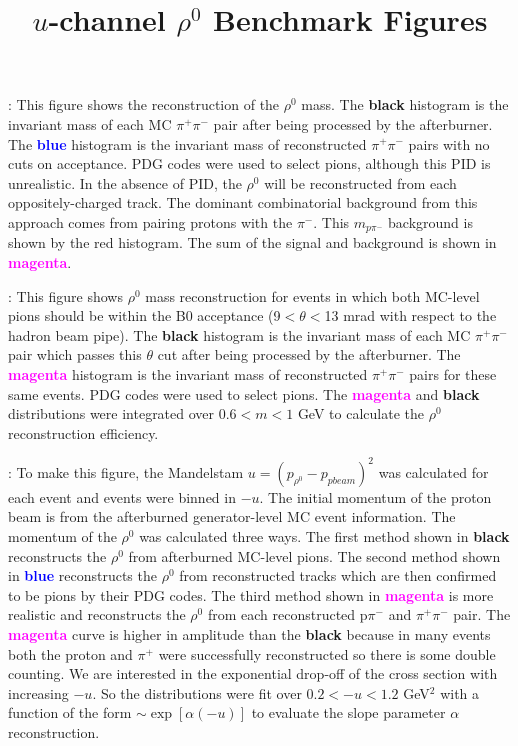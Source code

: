 \documentclass{bench}
\begin{document}
\title{$u$-channel $\rho^0$ Benchmark Figures}


\maketitle

:
This figure shows the reconstruction of the $\rho^0$ mass. The \textbf{black} histogram is the invariant mass of each MC $\pi^+\pi^-$ pair after being processed by the afterburner. The \textbf{\textcolor{blue}{blue}} histogram is the invariant mass of reconstructed $\pi^+\pi^-$ pairs with no cuts on acceptance. PDG codes were used to select pions, although this PID is unrealistic. In the absence of PID, the $\rho^0$ will be reconstructed from each oppositely-charged track. The dominant combinatorial background from this approach comes from pairing protons with the $\pi^-$. This $m_{p\pi^-}$ background is shown by the red histogram. The sum of the signal and background is shown in
\textbf{\textcolor{magenta}{magenta}}.


:
This figure shows $\rho^0$ mass reconstruction for events in which both MC-level pions should be within the B0 acceptance (9$<\theta<$13 mrad with respect to the hadron beam pipe). The \textbf{black} histogram is the invariant mass of each MC $\pi^+\pi^-$ pair which passes this $\theta$ cut after being processed by the afterburner. The \textbf{\textcolor{magenta}{magenta}} histogram is the invariant mass of reconstructed $\pi^+\pi^-$ pairs for these same events. PDG codes were used to select pions. The \textbf{\textcolor{magenta}{magenta}} and \textbf{black} distributions were integrated over $0.6<m<1$ GeV to calculate the $\rho^0$ reconstruction efficiency.


:
To make this figure, the Mandelstam $u = (p_{\rho^0}-p_{p beam})^2$ was calculated for each event and events were binned in $-u$. The initial momentum of the proton beam is from the afterburned generator-level MC event information. The momentum of the $\rho^0$ was calculated three ways. The first method shown in \textbf{black} reconstructs the $\rho^0$ from afterburned MC-level pions. The second method shown in \textbf{\textcolor{blue}{blue}} reconstructs the $\rho^0$ from reconstructed tracks which are then confirmed to be pions by their PDG codes. The third method shown in \textbf{\textcolor{magenta}{magenta}} is more realistic and reconstructs the $\rho^0$ from each reconstructed p$\pi^-$ and $\pi^+$$\pi^-$ pair. The \textbf{\textcolor{magenta}{magenta}} curve is higher in amplitude than the \textbf{black} because in many events both the proton and $\pi^+$ were successfully reconstructed so there is some double counting. We are interested in the exponential drop-off of the cross section with increasing $-u$. So the distributions were fit over $0.2<-u<1.2$ GeV$^2$ with a function of the form $\sim\exp[\alpha(-u)]$ to evaluate the slope parameter $\alpha$ reconstruction.
\end{document}

